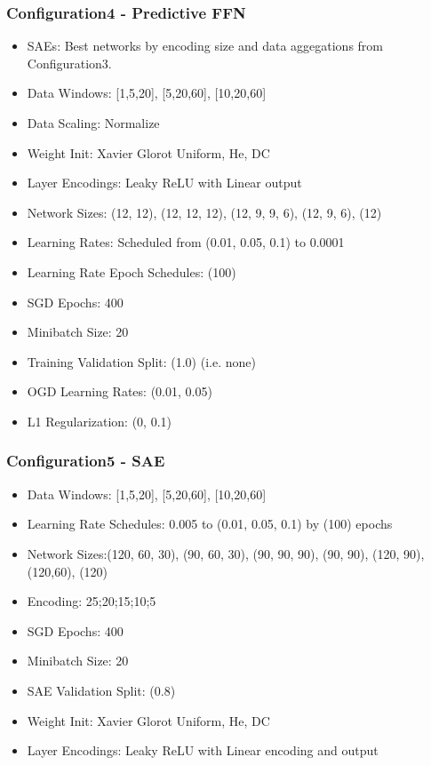 \documentclass[a4paper,latin]{paper}
\begin{document}
\subsubsection{Configuration4 - Predictive FFN}\label{config4}
\begin{itemize}
	\item SAEs: Best networks by encoding size and data aggegations from Configuration3.
	\item Data Windows: [1,5,20], [5,20,60], [10,20,60]
	\item Data Scaling: Normalize
	\item Weight Init: Xavier Glorot Uniform, He, DC
	\item Layer Encodings: Leaky ReLU with Linear output
	\item Network Sizes: (12, 12), (12, 12, 12), (12, 9, 9, 6), (12, 9, 6), (12)
	\item Learning Rates: Scheduled from (0.01, 0.05, 0.1) to 0.0001
	\item Learning Rate Epoch Schedules: (100)
	\item SGD Epochs: 400
	\item Minibatch Size: 20
	\item Training Validation Split: (1.0) (i.e. none)
	\item OGD Learning Rates: (0.01, 0.05)
	\item L1 Regularization: (0, 0.1)
\end{itemize}


\subsubsection{Configuration5 - SAE}\label{config5}


\begin{itemize}
	\item Data Windows: [1,5,20], [5,20,60], [10,20,60]
	\item Learning Rate Schedules: 0.005 to (0.01, 0.05, 0.1) by (100) epochs
	\item Network Sizes:(120, 60, 30), (90, 60, 30), (90, 90, 90), (90, 90), (120, 90), (120,60), (120)
	\item Encoding: 25;20;15;10;5
	\item SGD Epochs: 400
	\item Minibatch Size: 20
	\item SAE Validation Split: (0.8)
	\item Weight Init: Xavier Glorot Uniform, He, DC
	\item Layer Encodings: Leaky ReLU with Linear encoding and output
	
\end{itemize}
\end{document}
